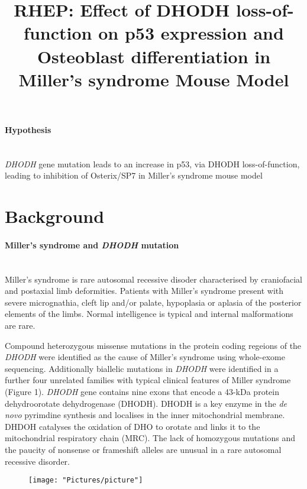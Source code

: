 \documentclass[12pt]{article}
\title{RHEP: Effect of DHODH loss-of-function on p53 expression and Osteoblast differentiation in Miller's syndrome Mouse Model}
\date{}
\begin{document}
	\maketitle 
	
\paragraph{Hypothesis}
~\\ \textit{DHODH} gene mutation leads to an increase in p53, via DHODH loss-of-function, leading to inhibition of Osterix/SP7 in Miller's syndrome mouse model

\section{Background}
\paragraph{Miller's syndrome and \textit{DHODH} mutation}
~\\ Miller's syndrome is rare autosomal recessive disoder characterised by craniofacial and postaxial limb deformities. Patients with Miller's syndrome present with severe micrognathia, cleft lip and/or palate, hypoplasia or aplasia of the posterior elements of the limbs. Normal intelligence is typical and internal malformations are rare.

Compound heterozygous missense mutations in the protein coding regeions of the \textit{DHODH} were identified as the cause of Miller's syndrome using whole-exome sequencing. Additionally biallelic mutations in \textit{DHODH} were identified in a further four unrelated families with typical clinical features of Miller syndrome (Figure 1).  \textit{DHODH} gene contains nine exons that encode a 43-kDa protein dehydroorotate dehydrogenase (DHODH). DHODH is a key enzyme in the \textit{de novo} pyrimdine synthesis and  localises in the inner mitochondrial membrane. DHDOH catalyses the oxidation of DHO to orotate and links it to the mitochondrial respiratory chain (MRC). The lack of homozygous mutations and the paucity of nonsense or frameshift alleles are unusual in a rare autosomal recessive disorder. 

\begin{figure}
	\centering
	\texttt{[image: "Pictures/picture"]}
	\caption{}
	\label{fig:screen-shot-2018-01-05-at-2}
\end{figure}
\end{document}
